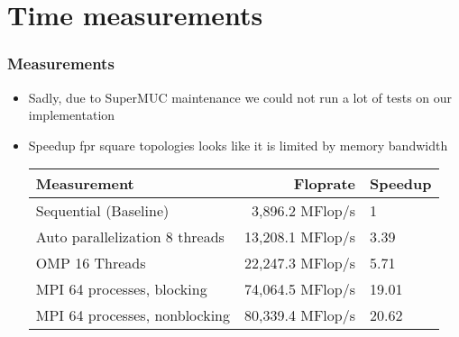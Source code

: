 \section{Time measurements}
\begin{frame}
  \frametitle{Measurements}
  \begin{itemize}
  \item Sadly, due to SuperMUC maintenance we could not run a lot of tests on our implementation
    \item Speedup fpr square topologies looks like it is limited by memory bandwidth
    \begin{center}
      \begin{tabular} {|l|r|l|}
        \hline
        Measurement & Floprate & Speedup \\ \hline
        Sequential (Baseline) & 3,896.2 MFlop/s & 1 \\ \hline
        Auto parallelization 8 threads & 13,208.1 MFlop/s & 3.39 \\ \hline
        OMP 16 Threads  & 22,247.3 MFlop/s & 5.71\\ \hline
        MPI 64 processes, blocking  & 74,064.5 MFlop/s & 19.01\\ \hline
        MPI 64 processes, nonblocking  & 80,339.4 MFlop/s & 20.62\\ \hline
      \end{tabular}
    \end{center}
  \end{itemize}
\end{frame}
